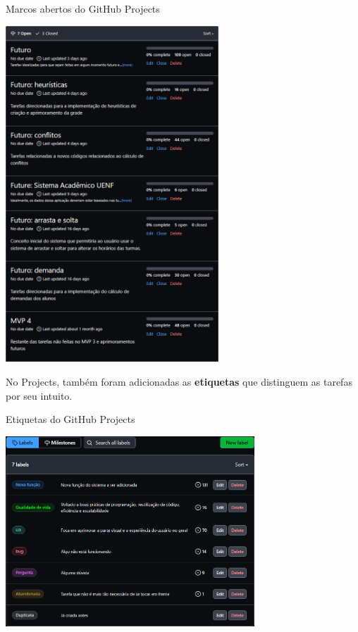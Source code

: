 \begin{MyCenteredFigure} \caption{Marcos abertos do GitHub Projects} \label{fig:ProjectsOpenMilestones}
  \includegraphics[width=0.6\textwidth]{files/img/2.02!5-desenvolvimento/2.02!5.1.4-sistema/GitHub Projects/GitHubProjects-Open_Milestones}
\end{MyCenteredFigure}

No Projects, também foram adicionadas as \textbf{etiquetas} que distinguem as tarefas por seu intuito.

\begin{MyCenteredFigure} \caption{Etiquetas do GitHub Projects} \label{fig:ProjectsLabels}
  \includegraphics[width=0.7\textwidth]{files/img/2.02!5-desenvolvimento/2.02!5.1.4-sistema/GitHub Projects/GitHubProjects-Labels}
\end{MyCenteredFigure}

